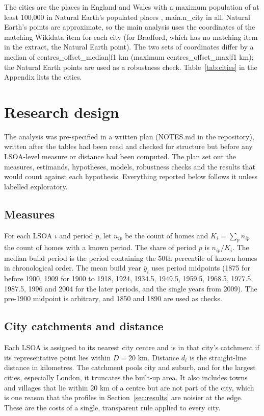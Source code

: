 The cities are the places in England and Wales with a maximum population of at least 100,000 in Natural Earth's populated places \citep{naturalearth}, {{main.n_city}} in all. Natural Earth's points are approximate, so the main analysis uses the coordinates of the matching Wikidata item for each city \citep{wikidata} (for Bradford, which has no matching item in the extract, the Natural Earth point). The two sets of coordinates differ by a median of {{centres_offset_median|f1}} km (maximum {{centres_offset_max|f1}} km); the Natural Earth points are used as a robustness check. Table~\ref{tab:cities} in the Appendix lists the cities.

\section{Research design}
\label{sec:design}
The analysis was pre-specified in a written plan (NOTES.md in the repository), written after the tables had been read and checked for structure but before any LSOA-level measure or distance had been computed. The plan set out the measures, estimands, hypotheses, models, robustness checks and the results that would count against each hypothesis. Everything reported below follows it unless labelled exploratory.

\subsection{Measures}
For each LSOA $i$ and period $p$, let $n_{ip}$ be the count of homes and $K_i=\sum_p n_{ip}$ the count of homes with a known period. The share of period $p$ is $n_{ip}/K_i$. The median build period is the period containing the 50th percentile of known homes in chronological order. The mean build year $\bar{y}_i$ uses period midpoints (1875 for before 1900, 1909 for 1900 to 1918, 1924, 1934.5, 1949.5, 1959.5, 1968.5, 1977.5, 1987.5, 1996 and 2004 for the later periods, and the single years from 2009). The pre-1900 midpoint is arbitrary, and 1850 and 1890 are used as checks.

\subsection{City catchments and distance}
Each LSOA is assigned to its nearest city centre and is in that city's catchment if its representative point lies within $D=20$ km. Distance $d_i$ is the straight-line distance in kilometres. The catchment pools city and suburb, and for the largest cities, especially London, it truncates the built-up area. It also includes towns and villages that lie within 20 km of a centre but are not part of the city, which is one reason that the profiles in Section~\ref{sec:results} are noisier at the edge. These are the costs of a single, transparent rule applied to every city.

